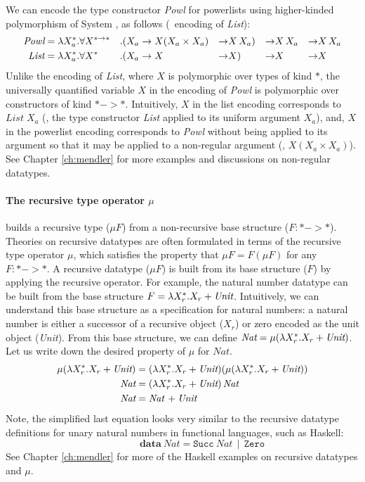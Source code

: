 We can encode the type constructor \textit{Powl} for powerlists using
higher-kinded polymorphism of System \Fw, as follows
(\cf\ encoding of \textit{List}):
\begin{align*}
\textit{Powl} &= \lambda X_a^{*}.\forall X^{* -> *}&.&
        (X_a -> X(X_a\times X_a) & -> & X\,X_a) & -> & X\,X_a & -> & X\,X_a \\
\textit{List} &= \lambda X_a^{*}.\forall X^{*}&.&
        (X_a -> X & -> & X) & -> & X & -> & X
\end{align*}
Unlike the encoding of \textit{List}, where $X$ is polymorphic over types
of kind $*$, the universally quantified variable $X$ in the encoding of
\textit{Powl} is polymorphic over constructors of kind $* -> *$.
Intuitively, $X$ in the list encoding corresponds to $\textit{List}\;X_a$
(\ie, the type constructor \textit{List} applied to its uniform argument $X_a$),
and, $X$ in the powerlist encoding corresponds to \textit{Powl} without
being applied to its argument so that it may be applied to a non-regular
argument (\eg, $X(X_a\times X_a)$). See Chapter \ref{ch:mendler} for more
examples and discussions on non-regular datatypes.

\paragraph{The recursive type operator $\mu$} builds a recursive type
($\mu F$) from a non-recursive base structure ($F:* -> *$).
Theories on recursive datatypes are often formulated in terms of
the recursive type operator $\mu$, which satisfies the property
that $\mu F = F (\mu F)$ for any $F: * -> *$. A recursive datatype ($\mu F$)
is built from its base structure ($F$) by applying the recursive operator.
For example, the natural number datatype can be built from the base structure
$F = \lambda X_r^{*}.X_r + \textit{Unit}$. Intuitively, we can understand this
base structure as a specification for natural numbers: a natural number is
either a successor of a recursive object ($X_r$)
or zero encoded as the unit object (\textit{Unit}).
From this base structure, we can define
$\textit{Nat} = \mu(\lambda X_r^{*}.X_r + \textit{Unit})$.
Let us write down the desired property of $\mu$ for $\textit{Nat}$.
\begin{align*}
\mu(\lambda X_r^{*}.X_r + \textit{Unit}) &=
(\lambda X_r^{*}.X_r + \textit{Unit})(\mu(\lambda X_r^{*}.X_r + \textit{Unit})) \\
\textit{Nat} &= (\lambda X_r^{*}.X_r + \textit{Unit})\,\textit{Nat} \\
\textit{Nat} &= \textit{Nat}\, + \textit{Unit}
\end{align*}
Note, the simplified last equation looks very similar to
the recursive datatype definitions for unary natural numbers
in functional languages, such as Haskell: \[ \qquad\qquad
\textbf{data}~\textit{Nat} = \texttt{Succ}~\textit{Nat}\,\mid\,\texttt{Zero} \]
See Chapter \ref{ch:mendler} %
for more of the Haskell examples on recursive datatypes and $\mu$.

